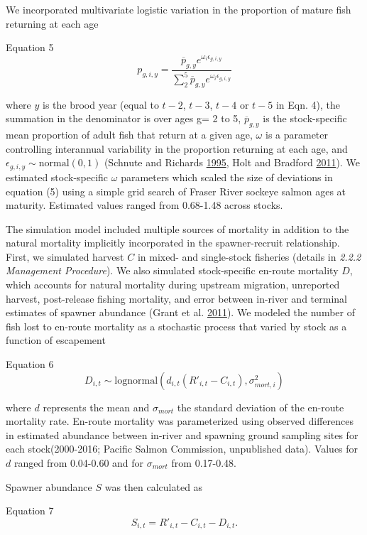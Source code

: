\documentclass[11pt]{book}
\begin{document}
We incorporated multivariate logistic variation in the proportion of mature fish returning at each age

Equation 5 \[ p_{g,i,y} = \frac{ \overline{p}_{g,y} e^{\omega_i \epsilon_{g,i,y}}} {\sum_{2}^{5} \overline{p}_{g,y} e^{\omega_i \epsilon_{g,i,y}}} \]

where \(y\) is the brood year (equal to \(t-2\), \(t-3\), \(t-4\) or \(t-5\) in Eqn. 4), the summation in the denominator is over ages g= 2 to 5, \(\overline{p}_{g,y}\) is the stock-specific mean proportion of adult fish that return at a given age, \(\omega\) is a parameter controlling interannual variability in the proportion returning at each age, and \(\epsilon_{g,i,y} \sim \text{normal}(0, 1)\) (Schnute and Richards \protect\hyperlink{ref-Schnute1995}{1995}, Holt and Bradford \protect\hyperlink{ref-Holt2011}{2011}). We estimated stock-specific \(\omega\) parameters which scaled the size of deviations in equation (5) using a simple grid search of Fraser River sockeye salmon ages at maturity. Estimated values ranged from 0.68-1.48 across stocks.

The simulation model included multiple sources of mortality in addition to the natural mortality implicitly incorporated in the spawner-recruit relationship. First, we simulated harvest \(C\) in mixed- and single-stock fisheries (details in \emph{2.2.2 Management Procedure}). We also simulated stock-specific en-route mortality \(D\), which accounts for natural mortality during upstream migration, unreported harvest, post-release fishing mortality, and error between in-river and terminal estimates of spawner abundance (Grant et al. \protect\hyperlink{ref-Grant2011}{2011}). We modeled the number of fish lost to en-route mortality as a stochastic process that varied by stock as a function of escapement

Equation 6 \[ D_{i,t} \sim \text{lognormal}(d_{i,t}(R'_{i,t} - C_{i,t}), \sigma^2_{mort,i}) \]

where \(d\) represents the mean and \(\sigma_{mort}\) the standard deviation of the en-route mortality rate. En-route mortality was parameterized using observed differences in estimated abundance between in-river and spawning ground sampling sites for each stock(2000-2016; Pacific Salmon Commission, unpublished data). Values for \(d\) ranged from 0.04-0.60 and for \(\sigma_{mort}\) from 0.17-0.48.

Spawner abundance \(S\) was then calculated as

Equation 7 \[ S_{i,t} = R'_{i,t} - C_{i,t} - D_{i,t} .\]
\end{document}

